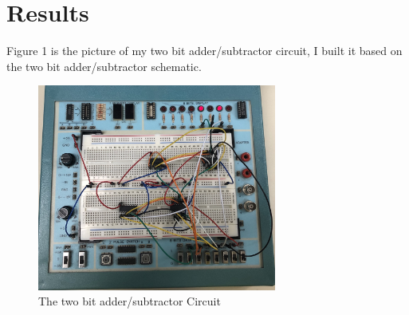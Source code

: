 \documentclass[11pt]{article}
\begin{document}
\section*{Results}

	Figure 1 is the picture of my two bit adder/subtractor circuit, I built it based on the two bit adder/subtractor schematic.\\
	\begin{figure}[ht]\centering
		\includegraphics[width=0.7\textwidth,trim=5cm 5cm 5cm 5cm,clip]{2-bitSubtractor}
		\caption{The  two bit adder/subtractor Circuit}
		\label{fig:2-bitSubtractor}
	\end{figure}
	
\end{document}
